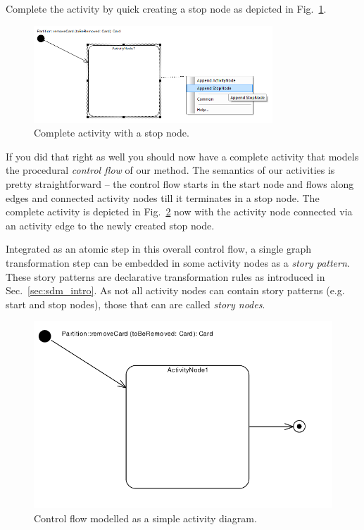Complete the activity by quick creating a stop node as depicted in Fig.~\ref{fig:sdm_stop_node}.

\begin{figure}[htp]
\begin{center}
  \includegraphics[width=0.8\textwidth]{pics/sdmBilder/removeCard/sdm05RAW}
  \caption{Complete activity with a stop node.}  
  \label{fig:sdm_stop_node}
\end{center}
\end{figure}

If you did that right as well you should now have a complete activity that models the procedural \emph{control flow} of our method.  
The semantics of our activities is pretty straightforward -- the control flow starts in the start node and flows along edges and connected activity nodes till it terminates in a stop node.  
The complete activity is depicted in Fig.~\ref{fig:sdm_complete_control_flow_simple} now with the activity node connected via an activity edge to the newly created stop node.

\label{story-pattern}

Integrated as an atomic step in this overall control flow, a single graph
transformation step can be embedded in some activity nodes as a \emph{story pattern}.  
These story patterns are declarative transformation rules as introduced in Sec.~\ref{sec:sdm_intro}.  
As not all activity nodes can contain story
patterns (e.g. start and stop nodes), those that can are called \emph{story nodes}. 

\begin{figure}[htp]
\begin{center}
  \includegraphics[width=\textwidth]{pics/sdmBilder/removeCard/sdm06RAW.pdf}
  \caption{Control flow modelled as a simple activity diagram.}  
  \label{fig:sdm_complete_control_flow_simple}
\end{center}
\end{figure}

